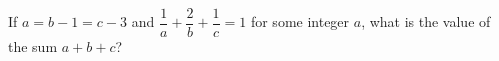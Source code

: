 If $a=b-1=c-3$ and $\dfrac{1}{a}+\dfrac{2}{b}+\dfrac{1}{c}=1$ for some integer $a$, what is the value of the sum $a+b+c$?
